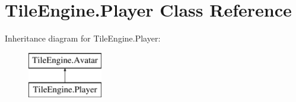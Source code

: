 \hypertarget{class_tile_engine_1_1_player}{\section{Tile\-Engine.\-Player Class Reference}
\label{class_tile_engine_1_1_player}
}
Inheritance diagram for Tile\-Engine.\-Player\-:\begin{figure}[H]
\begin{center}
\leavevmode
\includegraphics[height=2.000000cm]{class_tile_engine_1_1_player}
\end{center}
\end{figure}
